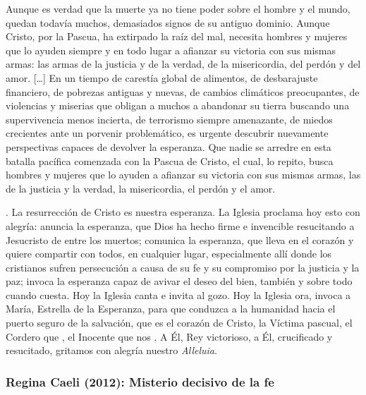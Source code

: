 \begin{body}
Aunque es verdad que la muerte ya no tiene poder sobre el hombre y el mundo, quedan todavía muchos, demasiados signos de su antiguo dominio. Aunque Cristo, por la Pascua, ha extirpado la raíz del mal, necesita hombres y mujeres que lo ayuden siempre y en todo lugar a afianzar su victoria con sus mismas armas: las armas de la justicia y de la verdad, de la misericordia, del perdón y del amor. [\ldots] En un tiempo de carestía global de alimentos, de desbarajuste financiero, de pobrezas antiguas y nuevas, de cambios climáticos preocupantes, de violencias y miserias que obligan a muchos a abandonar su tierra buscando una supervivencia menos incierta, de terrorismo siempre amenazante, de miedos crecientes ante un porvenir problemático, es urgente descubrir nuevamente perspectivas capaces de devolver la esperanza. Que nadie se arredre en esta batalla pacífica comenzada con la Pascua de Cristo, el cual, lo repito, busca hombres y mujeres que lo ayuden a afianzar su victoria con sus mismas armas, las de la justicia y la verdad, la misericordia, el perdón y el amor.

. La resurrección de Cristo es nuestra esperanza. La Iglesia proclama hoy esto con alegría: anuncia la esperanza, que Dios ha hecho firme e invencible resucitando a Jesucristo de entre los muertos; comunica la esperanza, que lleva en el corazón y quiere compartir con todos, en cualquier lugar, especialmente allí donde los cristianos sufren persecución a causa de su fe y su compromiso por la justicia y la paz; invoca la esperanza capaz de avivar el deseo del bien, también y sobre todo cuando cuesta. Hoy la Iglesia canta  e invita al gozo. Hoy la Iglesia ora, invoca a María, Estrella de la Esperanza, para que conduzca a la humanidad hacia el puerto seguro de la salvación, que es el corazón de Cristo, la Víctima pascual, el Cordero que , el Inocente que nos . A Él, Rey victorioso, a Él, crucificado y resucitado, gritamos con alegría nuestro \textit{Alleluia}.
\end{body}


\subsubsection{Regina Caeli (2012): Misterio decisivo de la fe}


